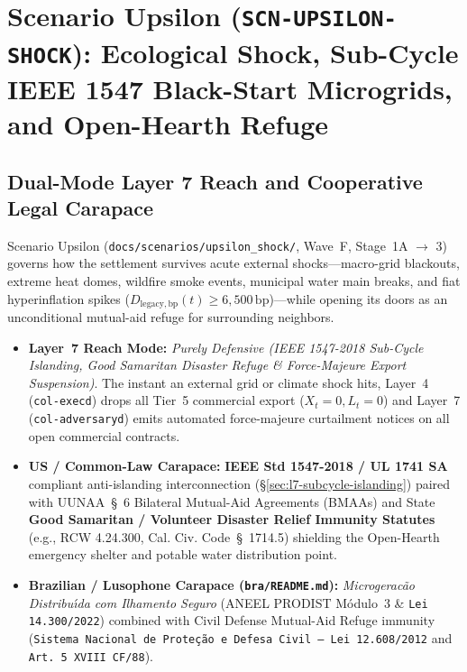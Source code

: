 \chapter{Scenario Upsilon (\texttt{SCN-UPSILON-SHOCK}): Ecological Shock, Sub-Cycle IEEE 1547 Black-Start Microgrids, and Open-Hearth Refuge}
\label{app:scenario-upsilon}

\section{Dual-Mode Layer 7 Reach and Cooperative Legal Carapace}
Scenario Upsilon (\texttt{docs/scenarios/upsilon\_shock/}, Wave~F, Stage~1A $\to$ 3) governs how the settlement survives acute external shocks---macro-grid blackouts, extreme heat domes, wildfire smoke events, municipal water main breaks, and fiat hyperinflation spikes ($D_{\mathrm{legacy,bp}}(t) \ge 6{,}500\,\mathrm{bp}$)---while opening its doors as an unconditional mutual-aid refuge for surrounding neighbors.
\begin{itemize}
    \item \textbf{Layer~7 Reach Mode:} \textit{Purely Defensive (IEEE 1547-2018 Sub-Cycle Islanding, Good Samaritan Disaster Refuge \& Force-Majeure Export Suspension)}. The instant an external grid or climate shock hits, Layer~4 (\texttt{col-execd}) drops all Tier~5 commercial export ($X_t = 0, L_t = 0$) and Layer~7 (\texttt{col-adversaryd}) emits automated force-majeure curtailment notices on all open commercial contracts.
    \item \textbf{US / Common-Law Carapace:} \textbf{IEEE Std 1547-2018 / UL 1741 SA} compliant anti-islanding interconnection (\S\ref{sec:l7-subcycle-islanding}) paired with UUNAA~\S~6 Bilateral Mutual-Aid Agreements (BMAAs) and State \textbf{Good Samaritan / Volunteer Disaster Relief Immunity Statutes} (e.g., RCW 4.24.300, Cal. Civ. Code~\S~1714.5) shielding the Open-Hearth emergency shelter and potable water distribution point.
    \item \textbf{Brazilian / Lusophone Carapace (\texttt{bra/README.md}):} \textit{Microgerac{\~a}o Distribu{\'\i}da com Ilhamento Seguro} (ANEEL PRODIST M{\'o}dulo~3 \& \texttt{Lei 14.300/2022}) combined with Civil Defense Mutual-Aid Refuge immunity (\texttt{Sistema Nacional de Prote{\c{c}}{\~a}o e Defesa Civil --- Lei 12.608/2012} and \texttt{Art.~5{\textordmasculine} XVIII CF/88}).
\end{itemize}

